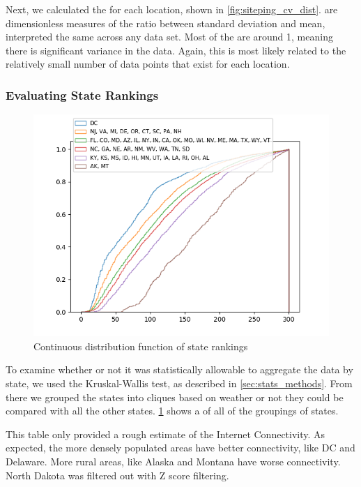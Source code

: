 Next, we calculated the \cv for each location, shown in \cref{fig:siteping_cv_dist}. \CVs are dimensionless measures of the ratio between standard deviation and mean, interpreted the same across any data set. Most of the \cvs are around 1, meaning there is significant variance in the data. Again, this is most likely related to the relatively small number of data points that exist for each location.

\subsubsection{Evaluating State Rankings}

\begin{figure}[h]
    \centering
    \includegraphics{images/siteping/siteping_clusters_cdf.png}
    \caption{Continuous distribution function of state rankings}
    \label{fig:siteping_cdf}
\end{figure}

To examine whether or not it was statistically allowable to aggregate the data by state, we used the Kruskal-Wallis test, as described in \cref{sec:stats_methods}. From there we grouped the states into cliques based on weather or not they could be compared with all the other states. \cref{fig:siteping_cdf} shows a \cdf of all of the groupings of states.

 

This table only provided a rough estimate of the Internet Connectivity. As expected, the more densely populated areas have better connectivity, like DC and Delaware. More rural areas, like Alaska and Montana have worse connectivity. North Dakota was filtered out with Z score filtering.

